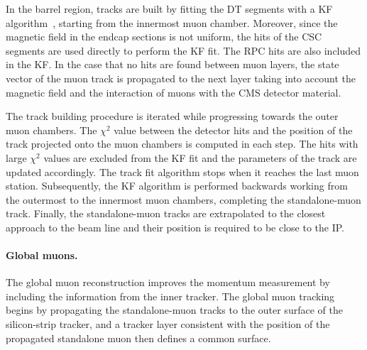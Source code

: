 In the barrel region, tracks are built by fitting the DT segments with a KF algorithm~\cite{KalmanFilter}, starting from the innermost muon chamber. Moreover, since the magnetic field in the endcap sections is not uniform, the hits of the CSC segments are used directly to perform the KF fit. The RPC hits are also included in the KF. In the case that no hits are found between muon layers, the state vector of the muon track is propagated to the next layer taking into account the magnetic field and the interaction of muons with the CMS detector material.

The track building procedure is iterated while progressing towards the outer muon chambers. The $\chi^{2}$ value between the detector hits and the position of the track projected onto the muon chambers is computed in each step. The hits with large $\chi^{2}$ values are excluded from the KF fit and the parameters of the track are updated accordingly. The track fit algorithm stops when it reaches the last muon station. Subsequently, the KF algorithm is performed backwards working from the outermost to the innermost muon chambers, completing the standalone-muon track. Finally, the standalone-muon tracks are extrapolated to the closest approach to the beam line and their position is required to be close to the IP.

\paragraph{Global muons.} The global muon reconstruction improves the momentum measurement by including the information from the inner tracker. The global muon tracking begins by propagating the standalone-muon tracks to the outer surface of the silicon-strip tracker, and a tracker layer consistent with the position of the propagated standalone muon then defines a common surface.

